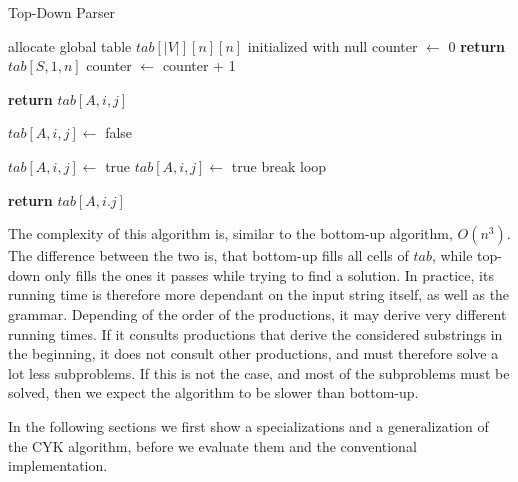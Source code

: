 \begin{algorithm}[H]
    \caption{Top-Down Parser}
    \label{alg:td}
    \begin{algorithmic}[1]
        \State allocate global table $tab[|V|][n][n]$ initialized with null
        \State counter $\leftarrow$ 0
        \State {}
        \State \textbf{return} $tab[S,1,n]$
        \EndFunction
            \State counter $\leftarrow$ counter + 1

                \State \textbf{return} $tab[A,i,j]$
            \EndIf

            \State $tab[A,i,j]\leftarrow$ false

                    \State $tab[A,i,j]\leftarrow$ true
                \EndIf
            \Else
                        \label{lst:td_call}
                        \State $tab[A,i,j]\leftarrow$ true
                        \State break loop
                        \EndIf
                    \EndFor
                \EndFor
            \EndIf

            \State \textbf{return} $tab[A,i.j]$
        \EndFunction
    \end{algorithmic}
\end{algorithm}

The complexity of this algorithm is, similar to the bottom-up algorithm, $O(n^3)$.
The difference between the two is, that bottom-up fills all cells of $tab$, while top-down only fills the ones it passes while trying to find a solution.
In practice, its running time is therefore more dependant on the input string itself, as well as the grammar.
Depending of the order of the productions, it may derive very different running times.
If it consults productions that derive the considered substrings in the beginning, it does not consult other productions, and must therefore solve a lot less subproblems.
If this is not the case, and most of the subproblems must be solved, then we expect the algorithm to be slower than bottom-up.

In the following sections we first show a specializations and a generalization of the CYK algorithm, before we evaluate them and the conventional implementation.
 